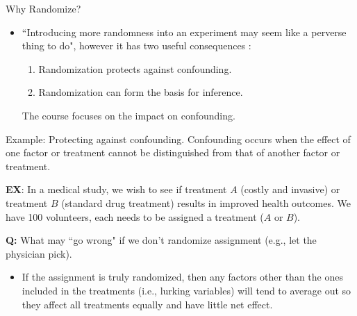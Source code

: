 \begin{frame}[allowframebreaks]{Why Randomize?}
  \begin{itemize}
    \item ``Introducing more randomness into an experiment may seem like a perverse thing to do", however it has two useful consequences \citep{oehlert2000}:
    \begin{enumerate}
      \item Randomization protects against \alert{confounding}.
      \item Randomization can form the basis for inference.
    \end{enumerate}
    The course focuses on the impact on confounding.
  \end{itemize}
  
  \framebreak
  
  \begin{exampleblock}{Example: Protecting against confounding.}
    Confounding occurs when the effect of one factor or treatment cannot be distinguished from that of another factor or treatment.
    
    \textbf{EX}: In a medical study, we wish to see if treatment $A$ (costly and invasive) or treatment $B$ (standard drug treatment) results in improved health outcomes.
    We have 100 volunteers, each needs to be assigned a treatment ($A$ or $B$).
    
    \textbf{Q:} What may ``go wrong" if we don't randomize assignment (e.g., let the physician pick).
  \end{exampleblock}
  
  
  
  \framebreak
  
  \begin{itemize}
    \item If the assignment is truly randomized, then any factors other than the ones included in the treatments (i.e., lurking variables) will tend to average out so they affect all treatments equally and have little net effect.
    
    

\end{itemize}
\end{frame}
